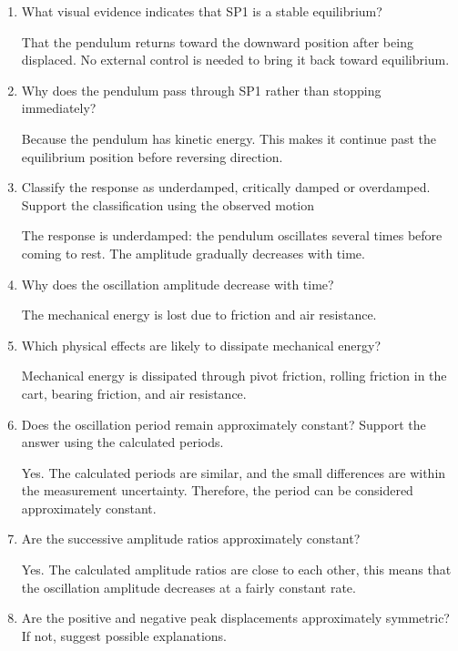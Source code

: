 \documentclass{article}
\begin{document}
\begin{enumerate}

 \item What visual evidence indicates that SP1 is a stable equilibrium?

 That the pendulum returns toward the downward position after being displaced. No external control is needed to bring it back toward equilibrium.

 \item Why does the pendulum pass through SP1 rather than stopping immediately?

 Because the pendulum has kinetic energy. This makes it continue past the equilibrium position before reversing direction.

 \item Classify the response as underdamped, critically damped or overdamped. Support the
classification using the observed motion

The response is underdamped: the pendulum oscillates several times before coming to rest. The amplitude gradually decreases with time.

\item Why does the oscillation amplitude decrease with time?

The mechanical energy is lost due to friction and air resistance.

\item Which physical effects are likely to dissipate mechanical energy?

Mechanical energy is dissipated through pivot friction, rolling friction in the cart, bearing friction, and air resistance.

\item Does the oscillation period remain approximately constant? Support the answer using
the calculated periods.

Yes. The calculated periods are similar, and the small differences are within the measurement uncertainty. Therefore, the period can be considered approximately constant.

\item Are the successive amplitude ratios approximately constant?

Yes. The calculated amplitude ratios are close to each other, this means that the oscillation amplitude decreases at a fairly constant rate.

\item Are the positive and negative peak displacements approximately symmetric? If not,
suggest possible explanations.


\end{enumerate}
\end{document}
